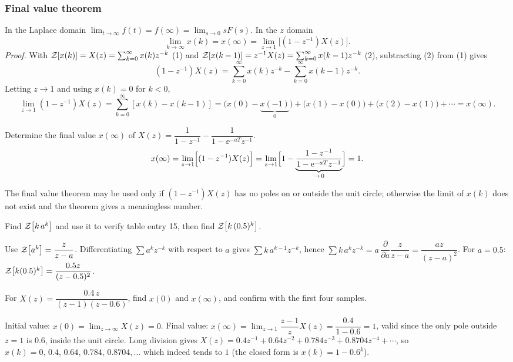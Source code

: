\subsubsection*{Final value theorem}
In the Laplace domain $\lim_{t\to\infty}f(t)=f(\infty)=\lim_{s\to0}sF(s)$. In the $z$ domain
\begin{equation}
  \lim_{k\to\infty}x(k)=x(\infty)=\lim_{z\to1}\bigl[(1-z^{-1})X(z)\bigr].
\end{equation}
\emph{Proof.} With $\mathcal{Z}\!\left[x(k)\right]=X(z)=\sum_{k=0}^{\infty}x(k)z^{-k}$ (1) and
$\mathcal{Z}\!\left[x(k-1)\right]=z^{-1}X(z)=\sum_{k=0}^{\infty}x(k-1)z^{-k}$ (2), subtracting (2) from (1) gives
\[
  (1-z^{-1})X(z)=\sum_{k=0}^{\infty}x(k)z^{-k}-\sum_{k=0}^{\infty}x(k-1)z^{-k}.
\]
Letting $z\to1$ and using $x(k)=0$ for $k<0$,
\[
  \lim_{z\to1}(1-z^{-1})X(z)=\sum_{k=0}^{\infty}[x(k)-x(k-1)]
  =\bigl(x(0)-\underbrace{x(-1)}_{0}\bigr)+\bigl(x(1)-x(0)\bigr)+\bigl(x(2)-x(1)\bigr)+\cdots=x(\infty).
\]

\begin{example}
Determine the final value $x(\infty)$ of $X(z)=\dfrac{1}{1-z^{-1}}-\dfrac{1}{1-\ee^{-aT}z^{-1}}$.
\[
  x(\infty)=\lim_{z\to1}\Bigl[(1-z^{-1})X(z)\Bigr]
  =\lim_{z\to1}\Bigl[1-\underbrace{\frac{1-z^{-1}}{1-\mathrm{e}^{-aT}z^{-1}}}_{\to\,0}\Bigr]=1.
\]
\end{example}

\begin{remark}
The final value theorem may be used only if $(1-z^{-1})X(z)$ has no poles on or outside the unit circle;
otherwise the limit of $x(k)$ does not exist and the theorem gives a meaningless number.
\end{remark}

\addedsection
\begin{problem}
Find $\mathcal{Z}\!\left[k\,a^{k}\right]$ and use it to verify table entry 15, then find $\mathcal{Z}\!\left[k\,(0.5)^{k}\right]$.
\end{problem}
\begin{solution}
Use $\mathcal{Z}\!\left[a^{k}\right]=\dfrac{z}{z-a}$. Differentiating $\sum a^{k}z^{-k}$ with respect to $a$ gives
$\sum k\,a^{k-1}z^{-k}$, hence $\sum k\,a^{k}z^{-k}=a\,\dfrac{\partial}{\partial a}\dfrac{z}{z-a}=\dfrac{az}{(z-a)^{2}}$.
For $a=0.5$: $\mathcal{Z}\!\left[k(0.5)^{k}\right]=\dfrac{0.5z}{(z-0.5)^{2}}$.
\end{solution}

\begin{problem}
For $X(z)=\dfrac{0.4\,z}{(z-1)(z-0.6)}$, find $x(0)$ and $x(\infty)$, and confirm with the first four samples.
\end{problem}
\begin{solution}
Initial value: $x(0)=\lim_{z\to\infty}X(z)=0$. Final value: $x(\infty)=\lim_{z\to1}\dfrac{z-1}{z}X(z)=\dfrac{0.4}{1-0.6}=1$,
valid since the only pole outside $z=1$ is $0.6$, inside the unit circle. Long division gives
$X(z)=0.4z^{-1}+0.64z^{-2}+0.784z^{-3}+0.8704z^{-4}+\cdots$, so $x(k)=0,\,0.4,\,0.64,\,0.784,\,0.8704,\dots$
which indeed tends to $1$ (the closed form is $x(k)=1-0.6^{k}$).
\end{solution}

